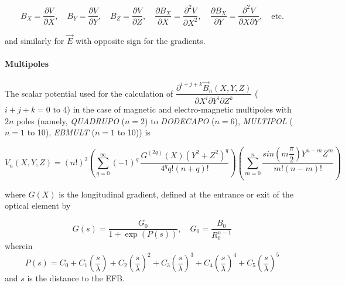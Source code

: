  \begin{equation}
	 	 B_X = \dfrac{\partial V}{\partial X}, 
	 	    \quad B_Y = \dfrac{\partial V }{ \partial Y}, 
	 	     \quad B_Z = \dfrac{\partial V }{ \partial Z}, 
	 	  \quad \dfrac{\partial B_X }{ \partial X} = \dfrac{\partial^2V}{\partial X^2},
	 	     \quad \dfrac{\partial B_X}{\partial Y} 
	 	               = \dfrac{\partial^2V}{\partial X\partial Y},
	 	    \quad\text{etc.}
 	\label{eq2-3-4}
 \end{equation}

\noindent  and similarly for $ \vec  E $ with opposite sign for the gradients. 


\paragraph{Multipoles}

\noindent The scalar potential used for the calculation of 
$ \dfrac{\partial^{i+j+k} \vec B_{n}(X,Y,Z)}{ \partial X^i\partial Y^i\partial 
Z^k}$ ($i+j+k= 0 \text{ to } 4$) in the case of 
 magnetic and electro-magnetic multipoles with $2n$ poles
(namely, \textsl{QUADRUPO} ($n = 2$) to  
\textsl{DODECAPO} ($n=6$),   
\textsl{MULTIPOL} ($n = 1$ to 10), 
\textsl{EBMULT} ($n=1$ to 10))   is~\cite{Biblio5}              %

\begin{equation}
	V_n(X,Y,Z)=(n!)^2 
	  \left( \sum^{ \infty}_{ q=0}(-1)^q \,
	        \dfrac{G^{(2q)}(X)(Y^2+Z^2)^q }{ 4^q q!(n+q)!} \right) 
	  \left( \sum^ n_{m=0}\dfrac{sin \left(m \dfrac{\pi }{ 2} \right) Y^{n-m} Z^m }{ m!(n-m)!} \right) 
	\label{eq2-3-5}
\end{equation}

 where $ G(X) $ is the longitudinal gradient, defined at the entrance 
 or exit of the optical element by

 \begin{equation}
	 G(s) = \dfrac{G_0 }{ 1+ \exp(P(s))} , \quad G_0 = \dfrac{B_0 }{R^{n-1}_0} 
 	\label{eq2-3-6}
 \end{equation}
wherein 
$$ P(s) = C_0
	       +C_1 \left(  \dfrac{s }{ \lambda} \right) 
	       +C_2 \left( \dfrac{s }{ \lambda} \right)^2 
	       + C_3 \left( \dfrac{s }{ \lambda} \right)^3 
	       +C_4 \left( \dfrac{s }{ \lambda} \right)^4 
	       + C_5 \left(\dfrac{s }{ \lambda} \right)^5 $$ 
and $s$ is the distance to the EFB.
 

